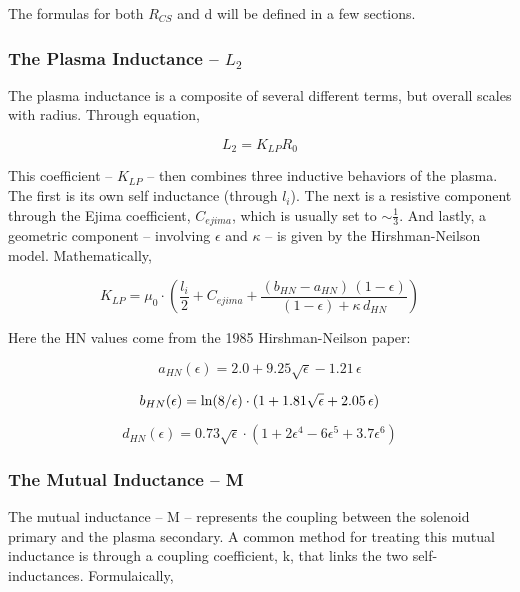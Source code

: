 The formulas for both $R_{CS}$ and d will be defined in a few sections.

\subsubsection{The Plasma Inductance -- $L_2$}

The plasma inductance is a composite of several different terms, but overall scales with radius. Through equation,

\begin{equation}
	L_2 = K_{LP} R_0
\end{equation}

This  coefficient -- $K_{LP}$ -- then combines three inductive behaviors of the plasma. The first is its own self inductance (through $l_i$). \cite{jeff} The next is a resistive component through the Ejima coefficient, $C_{ejima}$, which is usually set to $\sim \frac{1}{3}$. \cite{process} And lastly, a geometric component -- involving $\epsilon$ and $\kappa$ -- is given by the Hirshman-Neilson model. \cite{hn85} Mathematically,

\begin{equation}
	K_{LP} = \mu_0 \cdot \left( \frac{l_i}{2} + C_{ejima} + \frac{ ( b_{HN} - a_{HN} ) \, ( 1 - \epsilon ) }{ ( 1 - \epsilon ) + \kappa \, d_{HN} } \right)
\end{equation}

Here the HN values come from the 1985 Hirshman-Neilson paper:

\begin{equation}
	a_{HN}(\epsilon) = 2.0 + 9.25 \sqrt{\epsilon} - 1.21 \, \epsilon
\end{equation}

\begin{equation}
	b_{HN}(\epsilon) = \textnormal{ln} (8/\epsilon) \cdot ( 1 + 1.81 \sqrt{\epsilon} + 2.05 \, \epsilon )
\end{equation}

\begin{equation}
	d_{HN}(\epsilon) = 0.73 \sqrt{\epsilon}  \cdot ( 1 + 2 \epsilon^4 - 6 \epsilon^5 +3.7 \epsilon^6 )
\end{equation}

\subsubsection{The Mutual Inductance -- M}

The mutual inductance -- M -- represents the coupling between the solenoid primary and the plasma secondary. A common method for treating this mutual inductance is through a coupling coefficient, k, that links the two self-inductances. Formulaically, 


